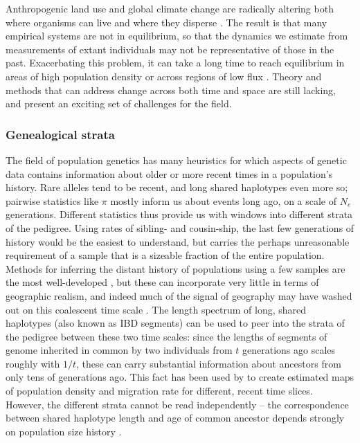 \documentclass{ar-1col}
\begin{document}
Anthropogenic land use
and global climate change
are radically altering both where organisms can live
and where they disperse \citep{parmesan1999}.
The result is that many empirical systems
are not in equilibrium,
so that the dynamics we estimate from
measurements of extant individuals may
not be representative of those in the past.
Exacerbating this problem,
it can take a long time to reach equilibrium
in areas of high population density
or across regions of low flux
\citep{CrowAoki1984group, whitlock1992temporal, slatkin1993isolation, WhitlockMcCauley1999}.
Theory and methods that can address change across both time and space
are still lacking,
and present an exciting set of challenges for the field.

\subsubsection{Genealogical strata}

The field of population genetics
has many heuristics for which aspects of genetic data
contains information about older or more recent times in a population's history.
Rare alleles tend to be recent,
and long shared haplotypes even more so;
pairwise statistics like $\pi$ mostly inform us about events long ago,
on a scale of $N_e$ generations.
Different statistics thus provide us with windows into different strata of the pedigree.
Using rates of sibling- and cousin-ship,
the last few generations of history would be the easiest to understand,
but carries the perhaps unreasonable requirement of a sample 
that is a sizeable fraction of the entire population.
Methods for inferring the distant history of populations using a few samples
are the most well-developed \citep[e.g.,]{dadi,psmc,momi},
but these can incorporate very little in terms of geographic realism,
and indeed much of the signal of geography 
may have washed out on this coalescent time scale \citep{wilkins2004separationoftimescales}.
The length spectrum of long, shared haplotypes
(also known as IBD segments)
can be used to peer into the strata of the pedigree between these two time scales:
since the lengths of segments of genome inherited in common by two individuals
from $t$ generations ago scales roughly with $1/t$, 
these can carry substantial information about ancestors from only tens of generations ago.
This fact has been used by \citet{alasadi2019maps}
to create estimated maps of population density and migration rate
for different, recent time slices.
However, the different strata cannot be read independently
-- the correspondence between shared haplotype length and age of common ancestor
depends strongly on population size history \citep{ralph2013geography}.
\end{document}
